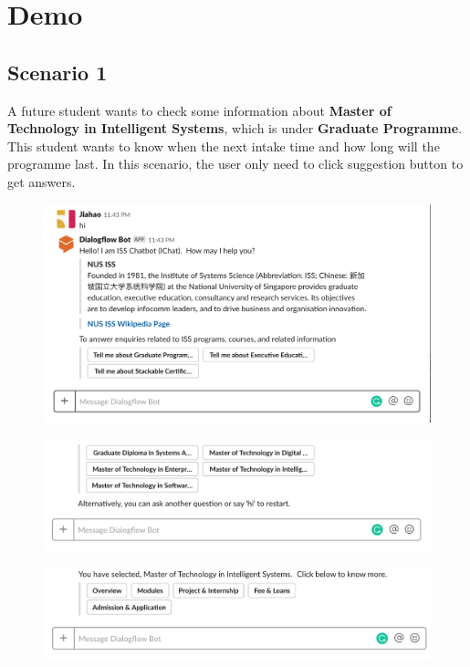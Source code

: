 \chapter{Demo} %
\label{cha:demo}

	\section{Scenario 1} %
	\label{sec:scenario_1}
		A future student wants to check some information about \textbf{Master of Technology in Intelligent Systems}, which is under \textbf{Graduate Programme}. This student wants to know when the next intake time and how long will the programme last. In this scenario, the user only need to click suggestion button to get answers.

		\begin{figure}[H]
			\centering
			\includegraphics[width=\linewidth, frame]{img/scenario_1.png}
		\end{figure}

		\begin{figure}[H]
			\centering
			\includegraphics[width=\linewidth, frame]{img/scenario_2.png}
		\end{figure}

		\begin{figure}[H]
			\centering
			\includegraphics[width=\linewidth, frame]{img/scenario_3.png}
		\end{figure}


